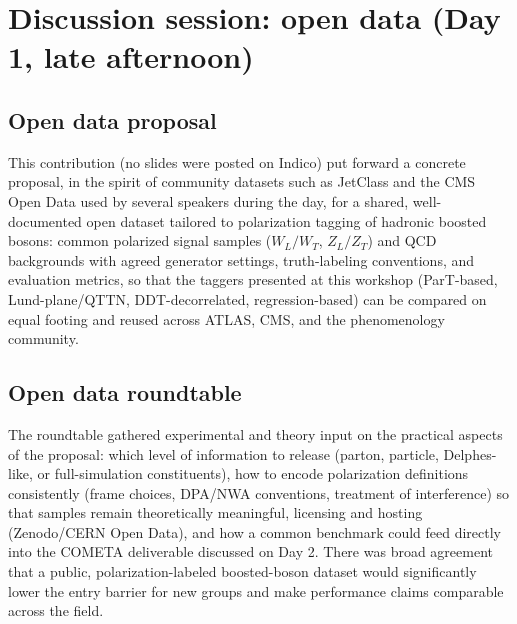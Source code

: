 \section{Discussion session: open data (Day 1, late afternoon)}

\subsection{Open data proposal}
This contribution (no slides were posted on Indico) put forward a concrete
proposal, in the spirit of community datasets such as JetClass and the CMS Open
Data used by several speakers during the day, for a shared, well-documented
open dataset tailored to polarization tagging of hadronic boosted bosons:
common polarized signal samples ($W_L/W_T$, $Z_L/Z_T$) and QCD backgrounds
with agreed generator settings, truth-labeling conventions, and evaluation
metrics, so that the taggers presented at this workshop (ParT-based,
Lund-plane/QTTN, DDT-decorrelated, regression-based) can be compared on equal
footing and reused across ATLAS, CMS, and the phenomenology community.

\subsection{Open data roundtable}
The roundtable gathered experimental and theory input on the practical aspects
of the proposal: which level of information to release (parton, particle,
Delphes-like, or full-simulation constituents), how to encode polarization
definitions consistently (frame choices, DPA/NWA conventions, treatment of
interference) so that samples remain theoretically meaningful, licensing and
hosting (Zenodo/CERN Open Data), and how a common benchmark could feed directly
into the COMETA deliverable discussed on Day 2. There was broad agreement that
a public, polarization-labeled boosted-boson dataset would significantly lower
the entry barrier for new groups and make performance claims comparable across
the field.
